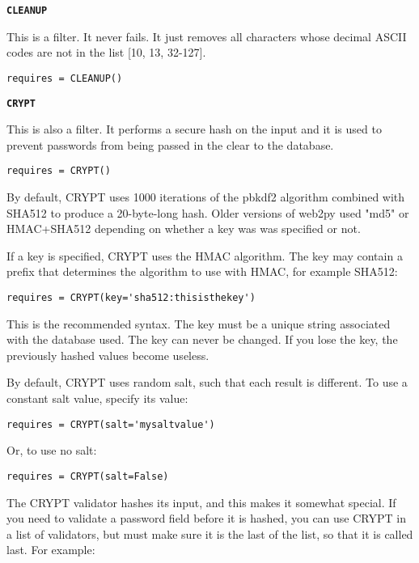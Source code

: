 \documentclass[justified,sixbynine,notoc]{tufte-book}
\def\ft{\small\tt}
\def\inxx#1{\index{#1}}
\begin{document}
\begin{fullwidth}
{\bf {\ft CLEANUP}}

\inxx{CLEANUP}

This is a filter. It never fails. It just removes all characters whose decimal ASCII codes are not in the list [10, 13, 32-127].
\begin{lstlisting}
requires = CLEANUP()
\end{lstlisting}

{\bf {\ft CRYPT}}

\inxx{CRYPT}

This is also a filter. It performs a secure hash on the input and it is used to prevent passwords from being passed in the clear to the database.
\begin{lstlisting}
requires = CRYPT()
\end{lstlisting}

By default, CRYPT uses 1000 iterations of the pbkdf2 algorithm combined with SHA512 to produce a 20-byte-long hash. Older versions of web2py used "md5" or HMAC+SHA512 depending on whether a key was was specified or not.

If a key is specified, CRYPT uses the HMAC algorithm. The key may contain a prefix that determines the algorithm to use with HMAC, for example SHA512:

\begin{lstlisting}
requires = CRYPT(key='sha512:thisisthekey')
\end{lstlisting}

This is the recommended syntax. The key must be a unique string associated with the database used. The key can never be changed. If you lose the key, the previously hashed values become useless.

By default, CRYPT uses random salt, such that each result is different. To use a constant salt value, specify its value:

\begin{lstlisting}
requires = CRYPT(salt='mysaltvalue')
\end{lstlisting}

Or, to use no salt:

\begin{lstlisting}
requires = CRYPT(salt=False)
\end{lstlisting}

The CRYPT validator hashes its input, and this makes it somewhat special. If you need to validate a password field before it is hashed, you can use CRYPT in a list of validators, but must make sure it is the last of the list, so that it is called last. For example:


\end{fullwidth}
\end{document}
